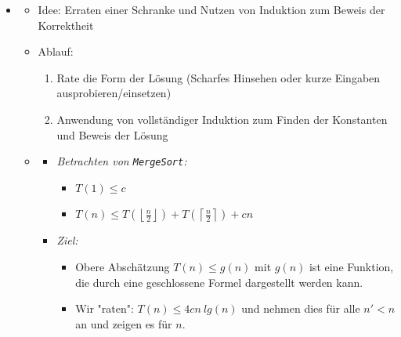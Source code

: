 \documentclass[
    12pt,
    a4paper,
    ngerman,
    color=3b,%
    marginpar=false,
    colorback=false,
    leqno,
]{tudaexercise}
\begin{document}
\begin{itemize}
    \item {}
          \begin{itemize}
              \item Idee: Erraten einer Schranke und Nutzen von Induktion zum Beweis der Korrektheit
              \item Ablauf:
                    \begin{enumerate}
                        \item Rate die Form der Lösung (Scharfes Hinsehen oder kurze Eingaben ausprobieren/einsetzen)
                        \item Anwendung von vollständiger Induktion zum Finden der Konstanten und Beweis der Lösung
                    \end{enumerate}
                    \clearpage
              \item {}
                    \begin{itemize}
                        \item \textit{Betrachten von \texttt{MergeSort}:}
                              \begin{itemize}
                                  \item $T(1) \leq c$
                                  \item $T(n) \leq T(\left \lfloor \frac{n}{2} \right \rfloor) + T(\left \lceil \frac{n}{2} \right \rceil) + cn$
                              \end{itemize}

                        \item \textit{Ziel:}
                              \begin{itemize}
                                  \item[]
                                        Obere Abschätzung $T(n) \leq g(n)$ mit $g(n)$ ist eine Funktion, die durch eine
                                        geschlossene Formel dargestellt werden kann.
                                  \item[]
                                        Wir \string"raten\string": $T(n) \leq 4cn~lg(n)$ und nehmen dies für alle $n' < n$ an und
                                        zeigen es für $n$.
                              \end{itemize}


\end{itemize}
\end{itemize}
\end{itemize}
\end{document}
